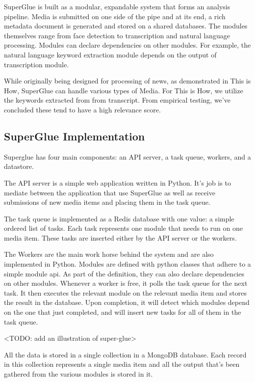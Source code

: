 SuperGlue is built as a modular, expandable system that forms an analysis pipeline. Media is submitted on one side of the pipe and at its end, a rich metadata document is generated and stored on a shared databases. The modules themselves range from face detection to transcription and natural language processing. Modules can declare dependencies on other modules. For example, the natural language keyword extraction module depends on the output of transcription module.

While originally being designed for processing of news, as demonstrated in This is How, SuperGlue can handle various types of Media. For This is How, we utilize the keywords extracted from from transcript. From empirical testing, we've concluded these tend to have a high relevance score.    

\subsection{SuperGlue Implementation}

Superglue has four main components: an API server, a task queue, workers, and a datastore. 

The API server is a simple web application written in Python. It's job is to mediate between the application that use SuperGlue as well as receive submissions of new media items and placing them in the task queue. 

The task queue is implemented as a Redis database with one value: a simple ordered list of tasks. Each task represents one module that needs to run on one media item. These tasks are inserted either by the API server or the workers. 

The Workers are the main work horse behind the system and are also implemented in Python. Modules are defined with python classes that adhere to a simple module api. As part of the definition, they can also declare dependencies on other modules. Whenever a worker is free, it polls the task queue for the next task. It then executes the relevant module on the relevant media item and stores the result in the database. Upon completion, it will detect which modules depend on the one that just completed, and will insert new tasks for all of them in the task queue. 

<TODO: add an illustration of super-glue>

All the data is stored in a single collection in a MongoDB database. Each record in this collection represents a single media item and all the output that's been gathered from the various modules is stored in it. 


